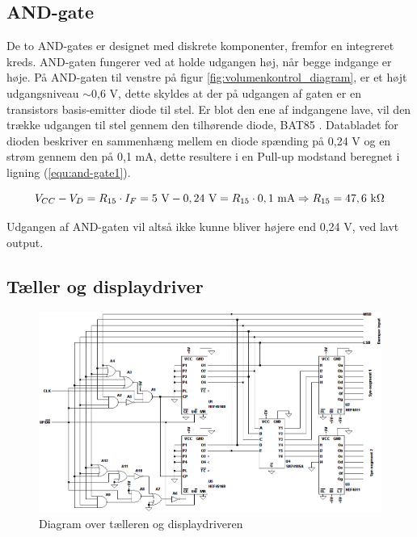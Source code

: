 \subsection*{AND-gate}
\label{volumenkontrol-design-and}

De to AND-gates er designet med diskrete komponenter, fremfor en integreret kreds. AND-gaten fungerer ved at holde udgangen høj, når begge indgange er høje. På AND-gaten til venstre på figur \ref{fig:volumenkontrol_diagram}, er et højt udgangsniveau $\sim$0,6 V, dette skyldes at der på udgangen af gaten er en transistors basis-emitter diode til stel. Er blot den ene af indgangene lave, vil den trække udgangen til stel gennem den tilhørende diode, BAT85 \cite{bat85-datablad}. Databladet for dioden beskriver en sammenhæng mellem en diode spænding på 0,24 V og en strøm gennem den på 0,1 mA, dette resultere i en Pull-up modstand beregnet i ligning (\ref{equ:and-gate1}).

\begin{equation}
\label{equ:and-gate1}
V_{CC} - V_D = R_{15} \cdot I_F = 5~\mathrm{V} - 0,24~\mathrm{V} = R_{15} \cdot 0,1~\mathrm{mA} \Rightarrow R_{15} = 47,6~\mathrm{k}\ohm
\end{equation}

Udgangen af AND-gaten vil altså ikke kunne bliver højere end 0,24 V, ved lavt output.

\clearpage
\subsection*{Tæller og displaydriver}
\label{volumenkontrol-design-taeller}

\begin{figure}[h]
\centering
\includegraphics[width=\textwidth]{teknisk/volumenkontrol/taeller.png}
\caption{Diagram over tælleren og displaydriveren}
\label{fig:taeller}
\end{figure}

